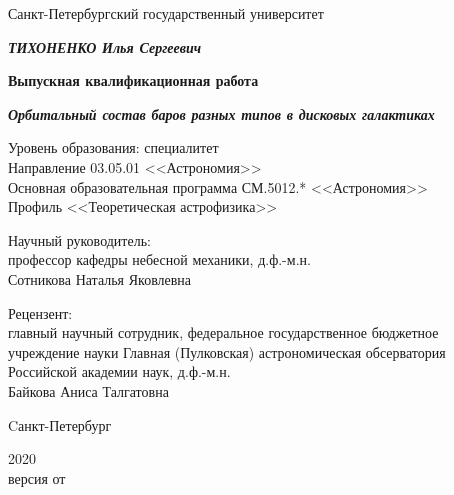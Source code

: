 \begin{titlepage}
  \centering
  {Санкт-Петербургский государственный университет \par}
  
  \vspace{1.5cm}

  {\bfseries \itshape\MakeUppercase{Тихоненко} Илья Сергеевич\par}
  \vspace{0.5\baselineskip}
  {\bfseries Выпускная квалификационная работа\par}
  \vspace{0.5\baselineskip}
  {\bfseries \itshape Орбитальный состав баров разных типов в дисковых галактиках\par}
  \vspace{1cm}
  {
    \singlespacing
    Уровень образования: специалитет\\
    Направление 03.05.01 <<Астрономия>>\\
    Основная образовательная программа СМ.5012.* <<Астрономия>>\\
    Профиль <<Теоретическая астрофизика>>
  }
  \vspace{1cm}
  \begin{flushright}
    \parbox{0.5\textwidth}{
      {Научный руководитель:} \\
      профессор кафедры небесной механики, д.ф.-м.н.\\
      Сотникова Наталья Яковлевна
    }
  \end{flushright}
  \par
  \begin{flushright}
    \parbox{0.5\textwidth}{
    {Рецензент:} \\
      главный научный сотрудник,
      федеральное государственное бюджетное учреждение науки Главная (Пулковская) 
      астрономическая обсерватория Российской академии наук,
      д.ф.-м.н.\\
      Байкова Аниса Талгатовна
    }
  \end{flushright}
  
  \vfill
  
  {Cанкт-Петербург \par}
  {2020}\\
  {\small версия от }
  \vspace*{-\baselineskip}
\end{titlepage}
